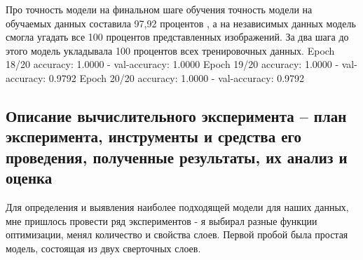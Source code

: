 Про точность модели 
на финальном шаге обучения точность модели на обучаемых данных составила 97,92 процентов , а на независимых данных модель смогла угадать все 100 процентов представленных изображений. 
За два шага до этого модель укладывала 100 процентов всех тренировочных данных. \newline
Epoch 18/20 \newline
accuracy: 1.0000 - val-accuracy: 1.0000 \newline
Epoch 19/20\newline
accuracy: 1.0000 - val-accuracy: 0.9792\newline
Epoch 20/20\newline
accuracy: 1.0000 - val-accuracy: 0.9792\newline
\begin{figure}[H]
\end{figure}
\subsection{Описание вычислительного эксперимента -- план эксперимента, инструменты и средства его проведения, полученные результаты, их анализ и оценка}
Для определения и выявления наиболее подходящей модели для наших данных, мне пришлось провести ряд экспериментов - я выбирал разные функции оптимизации, менял количество и свойства слоев. 
Первой пробой была простая модель, состоящая из двух сверточных слоев.

